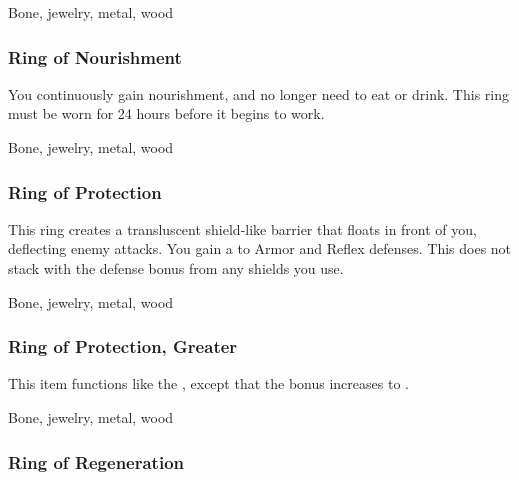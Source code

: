  


 Bone, jewelry, metal, wood


\lowercase{\hypertarget{item:Ring of Nourishment}{}}\label{item:Ring of Nourishment}
\hypertarget{item:Ring of Nourishment}{\subsubsection{Ring of Nourishment\hfill{}}}

You continuously gain nourishment, and no longer need to eat or drink.
This ring must be worn for 24 hours before it begins to work.



 


 Bone, jewelry, metal, wood


\lowercase{\hypertarget{item:Ring of Protection}{}}\label{item:Ring of Protection}
\hypertarget{item:Ring of Protection}{\subsubsection{Ring of Protection\hfill{}}}

This ring creates a transluscent shield-like barrier that floats in front of you, deflecting enemy attacks.
You gain a   to Armor and Reflex defenses.
This does not stack with the defense bonus from any shields you use.



 


 Bone, jewelry, metal, wood


\lowercase{\hypertarget{item:Ring of Protection, Greater}{}}\label{item:Ring of Protection, Greater}
\hypertarget{item:Ring of Protection, Greater}{\subsubsection{Ring of Protection, Greater\hfill{}}}

This item functions like the , except that the bonus increases to .



 


 Bone, jewelry, metal, wood


\lowercase{\hypertarget{item:Ring of Regeneration}{}}\label{item:Ring of Regeneration}
\hypertarget{item:Ring of Regeneration}{\subsubsection{Ring of Regeneration\hfill{}}}

